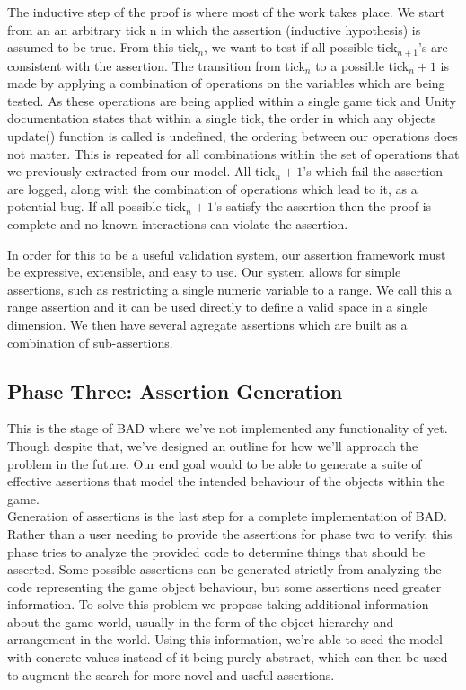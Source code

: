 \documentclass[letterpaper,twocolumn,10pt]{article}
\begin{document}
The inductive step of the proof is where most of the work takes place. We start from an an arbitrary tick n in which the assertion (inductive hypothesis) is assumed to be true. From this tick$_n$, we want to test if all possible tick$_{n+1}$'s are consistent with the assertion. The transition from tick$_n$ to a possible tick$_n+1$ is made by applying a combination of operations on the variables which are being tested. As these operations are being applied within a single game tick and Unity documentation states that within a single tick, the order in which any objects update() function is called is undefined, the ordering between our operations does not matter. This is repeated for all combinations within the set of operations that we previously extracted from our model. All tick$_n+1$'s which fail the assertion are logged, along with the combination of operations which lead to it, as a potential bug. If all possible tick$_n+1$'s satisfy the assertion then the proof is complete and no known interactions can violate the assertion.

In order for this to be a useful validation system, our assertion framework must be expressive, extensible, and easy to use. Our system allows for simple assertions, such as restricting a single numeric variable to a range. We call this a range assertion and it can be used directly to define a valid space in a single dimension. We then have several agregate assertions which are built as a combination of sub-assertions. 

\subsection{Phase Three: Assertion Generation}

This is the stage of BAD where we've not implemented any functionality of yet. Though despite that, we've designed an outline for how we'll approach the problem in the future. Our end goal would to be able to generate a suite of effective assertions that model the intended behaviour of the objects within the game. \\

Generation of assertions is the last step for a complete implementation of BAD. Rather than a user needing to provide the assertions for phase two to verify, this phase tries to analyze the provided code to determine things that should be asserted. Some possible assertions can be generated strictly from analyzing the code representing the game object behaviour, but some assertions need greater information. To solve this problem we propose taking additional information about the game world, usually in the form of the object hierarchy and arrangement in the world. Using this information, we're able to seed the model with concrete values instead of it being purely abstract, which can then be used to augment the search for more novel and useful assertions. \\
\end{document}
